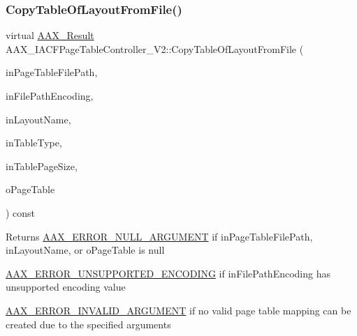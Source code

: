 \subsubsection{\texorpdfstring{CopyTableOfLayoutFromFile()}{CopyTableOfLayoutFromFile()}}
{\footnotesize\ttfamily virtual \mbox{\hyperlink{a00392_a4d8f69a697df7f70c3a8e9b8ee130d2f}{A\+A\+X\+\_\+\+Result}} A\+A\+X\+\_\+\+I\+A\+C\+F\+Page\+Table\+Controller\+\_\+\+V2\+::\+Copy\+Table\+Of\+Layout\+From\+File (\begin{DoxyParamCaption}\item[{const char $\ast$}]{in\+Page\+Table\+File\+Path,  }\item[{\mbox{\hyperlink{a00491_a8152e57310850693e4e7f00fc4922d74}{A\+A\+X\+\_\+\+E\+Text\+Encoding}}}]{in\+File\+Path\+Encoding,  }\item[{const char $\ast$}]{in\+Layout\+Name,  }\item[{uint32\+\_\+t}]{in\+Table\+Type,  }\item[{int32\+\_\+t}]{in\+Table\+Page\+Size,  }\item[{\mbox{\hyperlink{a01409}{I\+A\+C\+F\+Unknown}} $\ast$}]{o\+Page\+Table }\end{DoxyParamCaption}) const\hspace{0.3cm}{\ttfamily [pure virtual]}}





\begin{DoxyReturn}{Returns}
\mbox{\hyperlink{a00494_a5f8c7439f3a706c4f8315a9609811937aa77cf0ad2d545c97b095d8bc19a7c969}{A\+A\+X\+\_\+\+E\+R\+R\+O\+R\+\_\+\+N\+U\+L\+L\+\_\+\+A\+R\+G\+U\+M\+E\+NT}} if {\ttfamily in\+Page\+Table\+File\+Path}, {\ttfamily in\+Layout\+Name}, or {\ttfamily o\+Page\+Table} is null

\mbox{\hyperlink{a00494_a5f8c7439f3a706c4f8315a9609811937a17a1fd40c029a9337ede3bad778eab3b}{A\+A\+X\+\_\+\+E\+R\+R\+O\+R\+\_\+\+U\+N\+S\+U\+P\+P\+O\+R\+T\+E\+D\+\_\+\+E\+N\+C\+O\+D\+I\+NG}} if {\ttfamily in\+File\+Path\+Encoding} has unsupported encoding value

\mbox{\hyperlink{a00494_a5f8c7439f3a706c4f8315a9609811937a7d27a3bd88231e331c98d85f5b10e2eb}{A\+A\+X\+\_\+\+E\+R\+R\+O\+R\+\_\+\+I\+N\+V\+A\+L\+I\+D\+\_\+\+A\+R\+G\+U\+M\+E\+NT}} if no valid page table mapping can be created due to the specified arguments
\end{DoxyReturn}

